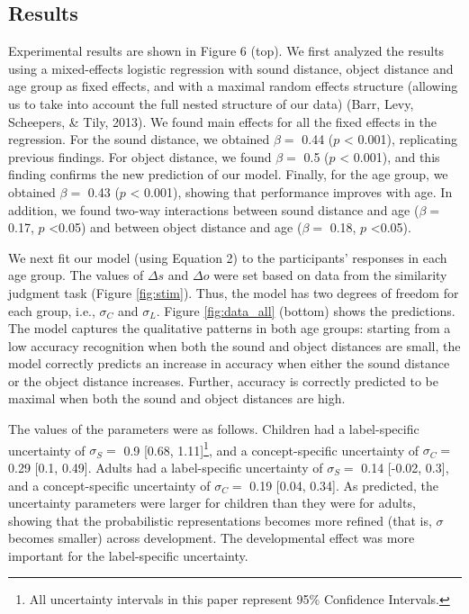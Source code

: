 \documentclass[10pt, letterpaper]{article}
\begin{document}
\subsection{Results}\label{results}

Experimental results are shown in Figure 6 (top). We first analyzed the
results using a mixed-effects logistic regression with sound distance,
object distance and age group as fixed effects, and with a maximal
random effects structure (allowing us to take into account the full
nested structure of our data) (Barr, Levy, Scheepers, \& Tily, 2013). We
found main effects for all the fixed effects in the regression. For the
sound distance, we obtained \(\beta =\) 0.44 (\(p\) \textless{} 0.001),
replicating previous findings. For object distance, we found \(\beta =\)
0.5 (\(p\) \textless{} 0.001), and this finding confirms the new
prediction of our model. Finally, for the age group, we obtained
\(\beta =\) 0.43 (\(p\) \textless{} 0.001), showing that performance
improves with age. In addition, we found two-way interactions between
sound distance and age (\(\beta =\) 0.17, \(p\) \textless{}0.05) and
between object distance and age (\(\beta =\) 0.18, \(p\)
\textless{}0.05).

We next fit our model (using Equation 2) to the participants' responses
in each age group. The values of \(\Delta s\) and \(\Delta o\) were set
based on data from the similarity judgment task (Figure \ref{fig:stim}).
Thus, the model has two degrees of freedom for each group, i.e.,
\(\sigma_C\) and \(\sigma_L\). Figure \ref{fig:data_all} (bottom) shows
the predictions. The model captures the qualitative patterns in both age
groups: starting from a low accuracy recognition when both the sound and
object distances are small, the model correctly predicts an increase in
accuracy when either the sound distance or the object distance
increases. Further, accuracy is correctly predicted to be maximal when
both the sound and object distances are high.

The values of the parameters were as follows. Children had a
label-specific uncertainty of \(\sigma_S =\) 0.9 {[}0.68,
1.11{]}\footnote{All uncertainty intervals in this paper represent 95\% Confidence Intervals.},
and a concept-specific uncertainty of \(\sigma_C =\) 0.29 {[}0.1,
0.49{]}. Adults had a label-specific uncertainty of \(\sigma_S =\) 0.14
{[}-0.02, 0.3{]}, and a concept-specific uncertainty of \(\sigma_C =\)
0.19 {[}0.04, 0.34{]}. As predicted, the uncertainty parameters were
larger for children than they were for adults, showing that the
probabilistic representations becomes more refined (that is, \(\sigma\)
becomes smaller) across development. The developmental effect was more
important for the label-specific uncertainty.
\end{document}
